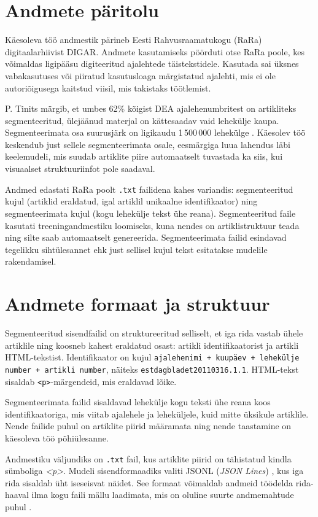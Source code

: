 \section{Andmete päritolu}\label{sec:andmete-parituolu} 
Käesoleva töö andmestik pärineb Eesti Rahvusraamatukogu (RaRa) digitaalarhiivist DIGAR. Andmete kasutamiseks pöörduti otse RaRa poole, kes võimaldas ligipääsu digiteeritud ajalehtede täistekstidele. Kasutada sai üksnes vabakasutuses või piiratud kasutusloaga märgistatud ajalehti, mis ei ole autoriõigusega kaitstud viisil, mis takistaks töötlemist.

P. Tinits märgib, et umbes 62\% kõigist DEA ajalehenumbritest on artikliteks segmenteeritud, ülejäänud materjal on kättesaadav vaid lehekülje kaupa. Segmenteerimata osa suurusjärk on ligikaudu 1\,500\,000 lehekülge \cite[lk~102]{tinits2025}. Käesolev töö keskendub just sellele segmenteerimata osale, eesmärgiga luua lahendus läbi keelemudeli, mis suudab artiklite piire automaatselt tuvastada ka siis, kui visuaalset struktuuriinfot pole saadaval.

Andmed edastati RaRa poolt \texttt{.txt} failidena kahes variandis: segmenteeritud kujul (artiklid eraldatud, igal artiklil unikaalne identifikaator) ning segmenteerimata kujul (kogu lehekülje tekst ühe reana). Segmenteeritud faile kasutati treeningandmestiku loomiseks, kuna nendes on artiklistruktuur teada ning silte saab automaatselt genereerida. Segmenteerimata failid esindavad tegelikku sihtülesannet ehk just sellisel kujul tekst esitatakse mudelile rakendamisel.


\section{Andmete formaat ja struktuur}\label{sec:andmete-formaat}
Segmenteeritud sisendfailid on struktureeritud selliselt, et iga rida vastab ühele artiklile ning koosneb kahest eraldatud osast: artikli identifikaatorist ja artikli HTML-tekstist. Identifikaator on kujul \texttt{ajalehenimi + kuupäev + lehekülje number + artikli number}, näiteks \texttt{estdagbladet20110316.1.1}. HTML-tekst sisaldab \texttt{<p>}-märgendeid, mis eraldavad lõike.

Segmenteerimata failid sisaldavad lehekülje kogu teksti ühe reana koos identifikaatoriga, mis viitab ajalehele ja leheküljele, kuid mitte üksikule artiklile. Nende failide puhul on artiklite piirid määramata ning nende taastamine on käesoleva töö põhiülesanne.

Andmestiku väljundiks on \texttt{.txt} fail, kus artiklite piirid on tähistatud kindla sümboliga \textit{<p>}. Mudeli sisendformaadiks valiti JSONL (\textit{JSON Lines}) \cite{jsonlines}, 
kus iga rida sisaldab üht iseseisvat näidet. See formaat võimaldab andmeid 
töödelda rida-haaval ilma kogu faili mällu laadimata, mis on oluline 
suurte andmemahtude puhul \cite{jsonlines}.


